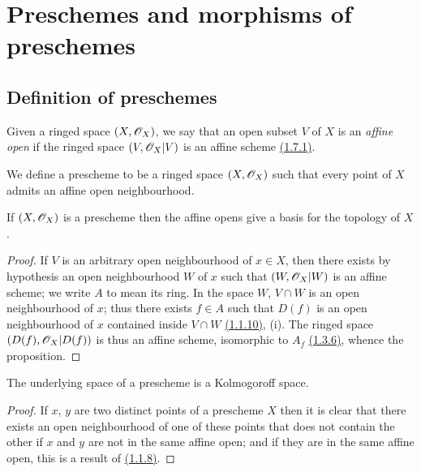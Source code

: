 \section{Preschemes and morphisms of preschemes}
\label{section-preschemes-and-morphisms}

\subsection{Definition of preschemes}
\label{subsection-preschemes-definition}

\begin{env}[2.1.1]
\label{env-1.2.1.1}
Given a ringed space $(X,\mathscr{O}_X)$, we say that an open subset
$V$ of $X$ is an {\em affine open} if the ringed space $(V,\mathscr{O}_X|V)$ is an
affine scheme \hyperref[defn-1.1.7.1]{(1.7.1)}.
\end{env}

\begin{defn}[2.1.2]
\label{defn-1.2.1.2}
We define a prescheme to be a ringed space
$(X,\mathscr{O}_X)$ such that every point of $X$ admits an affine open neighbourhood.
\end{defn}

\begin{prop}[2.1.3]
\label{prop-1.2.1.3}
If $(X,\mathscr{O}_X)$ is a prescheme then the affine opens give a basis for the topology of $X$.
\end{prop}

\begin{proof}
\label{proof-prop-1.2.1.3}
If $V$ is an arbitrary open neighbourhood of $x\in X$, then there
exists by hypothesis an open neighbourhood $W$ of $x$ such that $(W,\mathscr{O}_X|W)$ is
an affine scheme; we write $A$ to mean its ring. In the space $W$, $V\cap W$ is
an open neighbourhood of $x$; thus there exists $f\in A$ such that $D(f)$ is an
open neighbourhood of $x$ contained inside $V\cap W$ \hyperref[prop-1.1.1.10]{(1.1.10)}, (i).
The ringed space $(D(f),\mathscr{O}_X|D(f))$ is thus an affine scheme, isomorphic to $A_f$
\hyperref[prop-1.1.3.6]{(1.3.6)}, whence the proposition.
\end{proof}

\begin{prop}[2.1.4]
\label{prop-1.2.1.4}
The underlying space of a prescheme is a Kolmogoroff space.
\end{prop}

\begin{proof}
\label{proof-prop-1.2.1.4}
If $x$, $y$ are two distinct points of a prescheme $X$ then it is clear
that there exists an open neighbourhood of one of these points that does not
contain the other if $x$ and $y$ are not in the same affine open; and if they
are in the same affine open, this is a result of \hyperref[cor-1.1.1.8]{(1.1.8)}.
\end{proof}

